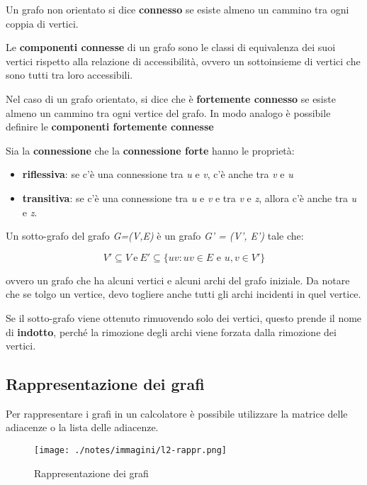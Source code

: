 Un grafo non orientato si dice \textbf{connesso} se esiste almeno un
cammino tra ogni coppia di vertici.

Le \textbf{componenti connesse} di un grafo sono le classi di
equivalenza dei suoi vertici rispetto alla relazione di accessibilità,
ovvero un sottoinsieme di vertici che sono tutti tra loro accessibili.

Nel caso di un grafo orientato, si dice che è \textbf{fortemente
connesso} se esiste almeno un cammino tra ogni vertice del grafo. In
modo analogo è possibile definire le \textbf{componenti fortemente
connesse}

Sia la \textbf{connessione} che la \textbf{connessione forte} hanno le
proprietà:

\begin{itemize}
\item
  \textbf{riflessiva}: se c'è una connessione tra \emph{u} e \emph{v},
  c'è anche tra \emph{v} e \emph{u}
\item
  \textbf{transitiva}: se c'è una connessione tra \emph{u} e \emph{v} e
  tra \emph{v} e \emph{z}, allora c'è anche tra \emph{u} e \emph{z}.
\end{itemize}

Un sotto-grafo del grafo \emph{G=(V,E)} è un grafo \emph{G' = (V', E')}
tale che:

$$
V' \subseteq V \: \text{e} \: E' \subseteq \{ uv : uv \in E \text{ e } u,v \in V' \}
$$

ovvero un grafo che ha alcuni vertici e alcuni archi del grafo iniziale.
Da notare che se tolgo un vertice, devo togliere anche tutti gli archi
incidenti in quel vertice.

Se il sotto-grafo viene ottenuto rimuovendo solo dei vertici, questo
prende il nome di \textbf{indotto}, perché la rimozione degli archi
viene forzata dalla rimozione dei vertici.

\subsection{Rappresentazione dei grafi}\label{rappresentazione-dei-grafi}

Per rappresentare i grafi in un calcolatore è possibile utilizzare la
matrice delle adiacenze o la lista delle adiacenze.

\begin{figure}[htbp]
\centering
\texttt{[image: ./notes/immagini/l2-rappr.png]}
\caption{Rappresentazione dei grafi}
\end{figure}

